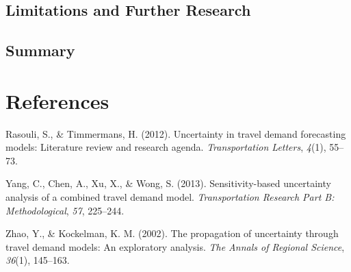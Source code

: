 \documentclass[fancy, masters,twoside]{byuthesis}
\newlength{\cslhangindent}
\newlength{\cslentryspacingunit} %
\newenvironment{CSLReferences}[2] %
 {%
  \setlength{\parindent}{0pt}
  \ifodd #1
  \let\oldpar\par
  \def\par{\hangindent=\cslhangindent\oldpar}
  \fi
  \setlength{\parskip}{#2\cslentryspacingunit}
 }%
 {}
\begin{document}
\hypertarget{limitations-and-further-research}{%
\section{Limitations and Further Research}\label{limitations-and-further-research}}

\hypertarget{summary-3}{%
\section{Summary}\label{summary-3}}

\hypertarget{references}{%
\chapter*{References}\label{references}}

\pagestyle{myrefs}

\hypertarget{refs}{}
\begin{CSLReferences}{1}{0}
\leavevmode{}%
Rasouli, S., \& Timmermans, H. (2012). Uncertainty in travel demand forecasting models: Literature review and research agenda. \emph{Transportation Letters}, \emph{4}(1), 55--73.

\leavevmode{}%
Yang, C., Chen, A., Xu, X., \& Wong, S. (2013). Sensitivity-based uncertainty analysis of a combined travel demand model. \emph{Transportation Research Part B: Methodological}, \emph{57}, 225--244.

\leavevmode{}%
Zhao, Y., \& Kockelman, K. M. (2002). The propagation of uncertainty through travel demand models: An exploratory analysis. \emph{The Annals of Regional Science}, \emph{36}(1), 145--163.

\end{CSLReferences}

\cleardoublepage
\pagestyle{byu}

%
\end{document}
